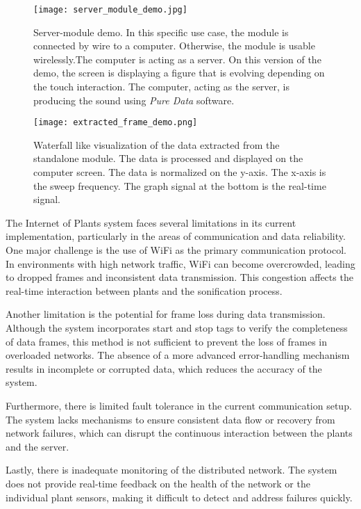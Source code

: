 \begin{figure}[h!]
    \centering
    \texttt{[image: server\_module\_demo.jpg]}
    \caption{Server-module demo. In this specific use case, the module is connected by wire to a computer. Otherwise, the module is usable wirelessly.The computer is acting as a server. On this version of the demo, the screen is displaying a figure that is evolving depending on the touch interaction. The computer, acting as the server, is producing the sound using \textit{Pure Data} software.}
    \vspace{0.1cm}
    \label{fig:server_module_demo}
\end{figure}

\begin{figure}[h!]
    \centering
    \texttt{[image: extracted\_frame\_demo.png]}
    \caption{Waterfall like visualization of the data extracted from the standalone module. The data is processed and displayed on the computer screen. The data is normalized on the y-axis. The x-axis is the sweep frequency. The graph signal at the bottom is the real-time signal.}
    \vspace{0.1cm}
    \label{fig:extracted_frame_demo}
\end{figure}

The Internet of Plants system faces several limitations in its current implementation, particularly in the areas of communication and data reliability. One major challenge is the use of WiFi as the primary communication protocol. In environments with high network traffic, WiFi can become overcrowded, leading to dropped frames and inconsistent data transmission. This congestion affects the real-time interaction between plants and the sonification process.

Another limitation is the potential for frame loss during data transmission. Although the system incorporates start and stop tags to verify the completeness of data frames, this method is not sufficient to prevent the loss of frames in overloaded networks. The absence of a more advanced error-handling mechanism results in incomplete or corrupted data, which reduces the accuracy of the system.

Furthermore, there is limited fault tolerance in the current communication setup. The system lacks mechanisms to ensure consistent data flow or recovery from network failures, which can disrupt the continuous interaction between the plants and the server.

Lastly, there is inadequate monitoring of the distributed network. The system does not provide real-time feedback on the health of the network or the individual plant sensors, making it difficult to detect and address failures quickly.

